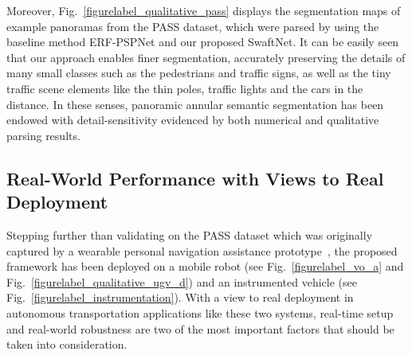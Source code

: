 \documentclass[letterpaper, 10 pt, conference]{ieeeconf}
\begin{document}

Moreover, Fig.~\ref{figurelabel_qualitative_pass} displays the segmentation maps of example panoramas from the PASS dataset, which were parsed by using the baseline method ERF-PSPNet and our proposed SwaftNet. It can be easily seen that our approach enables finer segmentation, accurately preserving the details of many small classes such as the pedestrians and traffic signs, as well as the tiny traffic scene elements like the thin poles, traffic lights and the cars in the distance. In these senses, panoramic annular semantic segmentation has been endowed with detail-sensitivity evidenced by both numerical and qualitative parsing results.

\subsection{Real-World Performance with Views to Real Deployment}

Stepping further than validating on the PASS dataset which was originally captured by a wearable personal navigation assistance prototype~\cite{yang2019can}, the proposed framework has been deployed on a mobile robot (see Fig.~\ref{figurelabel_vo_a} and Fig.~\ref{figurelabel_qualitative_ugv_d}) and an instrumented vehicle (see Fig.~\ref{figurelabel_instrumentation}). With a view to real deployment in autonomous transportation applications like these two systems, real-time setup and real-world robustness are two of the most important factors that should be taken into consideration. 
\end{document}
